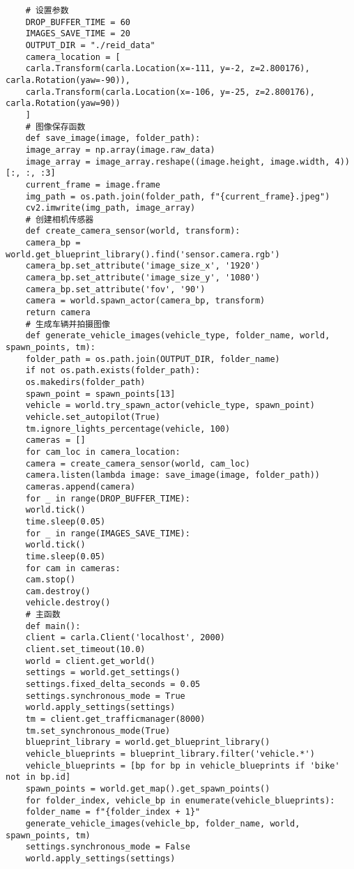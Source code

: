 \begin{lstlisting}
	# 设置参数
	DROP_BUFFER_TIME = 60
	IMAGES_SAVE_TIME = 20
	OUTPUT_DIR = "./reid_data"
	camera_location = [
	carla.Transform(carla.Location(x=-111, y=-2, z=2.800176), carla.Rotation(yaw=-90)),
	carla.Transform(carla.Location(x=-106, y=-25, z=2.800176), carla.Rotation(yaw=90))
	]
	# 图像保存函数
	def save_image(image, folder_path):
	image_array = np.array(image.raw_data)
	image_array = image_array.reshape((image.height, image.width, 4))[:, :, :3]
	current_frame = image.frame
	img_path = os.path.join(folder_path, f"{current_frame}.jpeg")
	cv2.imwrite(img_path, image_array)
	# 创建相机传感器
	def create_camera_sensor(world, transform):
	camera_bp = world.get_blueprint_library().find('sensor.camera.rgb')
	camera_bp.set_attribute('image_size_x', '1920')
	camera_bp.set_attribute('image_size_y', '1080')
	camera_bp.set_attribute('fov', '90')
	camera = world.spawn_actor(camera_bp, transform)
	return camera
	# 生成车辆并拍摄图像
	def generate_vehicle_images(vehicle_type, folder_name, world, spawn_points, tm):
	folder_path = os.path.join(OUTPUT_DIR, folder_name)
	if not os.path.exists(folder_path):
	os.makedirs(folder_path)
	spawn_point = spawn_points[13]
	vehicle = world.try_spawn_actor(vehicle_type, spawn_point)
	vehicle.set_autopilot(True)
	tm.ignore_lights_percentage(vehicle, 100)
	cameras = []
	for cam_loc in camera_location:
	camera = create_camera_sensor(world, cam_loc)
	camera.listen(lambda image: save_image(image, folder_path))
	cameras.append(camera)
	for _ in range(DROP_BUFFER_TIME):
	world.tick()
	time.sleep(0.05)
	for _ in range(IMAGES_SAVE_TIME):
	world.tick()
	time.sleep(0.05)
	for cam in cameras:
	cam.stop()
	cam.destroy()
	vehicle.destroy()
	# 主函数
	def main():
	client = carla.Client('localhost', 2000)
	client.set_timeout(10.0)
	world = client.get_world()
	settings = world.get_settings()
	settings.fixed_delta_seconds = 0.05
	settings.synchronous_mode = True
	world.apply_settings(settings)
	tm = client.get_trafficmanager(8000)
	tm.set_synchronous_mode(True)
	blueprint_library = world.get_blueprint_library()
	vehicle_blueprints = blueprint_library.filter('vehicle.*')
	vehicle_blueprints = [bp for bp in vehicle_blueprints if 'bike' not in bp.id]
	spawn_points = world.get_map().get_spawn_points()
	for folder_index, vehicle_bp in enumerate(vehicle_blueprints):
	folder_name = f"{folder_index + 1}"
	generate_vehicle_images(vehicle_bp, folder_name, world, spawn_points, tm)
	settings.synchronous_mode = False
	world.apply_settings(settings)
\end{lstlisting}


